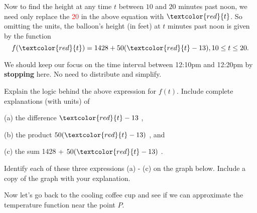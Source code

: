 \documentclass{ximera}
\begin{document}
\begin{example}
\begin{explanation}
Now to find the height at any time $t$ between $10$ and $20$ minutes past noon, we need only replace the \textcolor{red}{20} in the above equation with $\textcolor{red}{t}$. So omitting the units, the balloon's height (in feet) at $t$ minutes past noon is given by the function
\[
   f(\textcolor{red}{t}) = 1428  + 50( \textcolor{red}{t} - 13) , 10\leq t \leq 20.
\]

We should keep our focus on the time interval between 12:10pm and 12:20pm by {\bf stopping} here. No need to distribute and simplify. 

\end{explanation}
\end{example}


\begin{question}   \label{Q3:LF}
Explain the logic behind the above expression for $f(t)$. Include complete explanations (with units) of 

(a) the difference $\textcolor{red}{t} - 13$ ,

(b) the product $50(\textcolor{red}{t}-13)$ , and

(c) the sum 1428  + $50( \textcolor{red}{t} - 13)$  .

Identify each of these three expressions (a) - (c) on the graph below. Include a copy of the graph with your explanation. 

\begin{exploration}\label{Exp2:LF}

 
\begin{onlineOnly}
    \begin{center}
\end{center}
\end{onlineOnly}
\end{exploration}

\end{question}



Now let's go back to the cooling coffee cup and see if we can approximate the temperature function near the point $P$.
\end{document}

